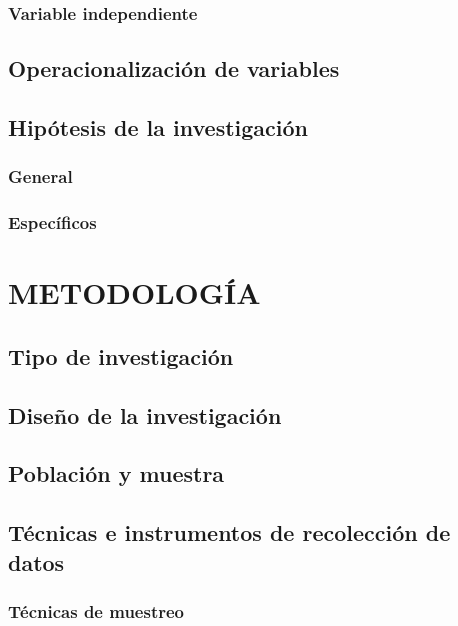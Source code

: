 \documentclass[12pt,a4paper,oneside]{report}
\begin{document}
\subsection{Variable independiente}

\section{Operacionalización de variables}

\section{Hipótesis de la investigación}

\subsection{General}

\subsection{Específicos}

\chapter{METODOLOGÍA}

\section{Tipo de investigación}

\section{Diseño de la investigación}

\section{Población y muestra}

\section{Técnicas e instrumentos de recolección de datos}

\subsection{Técnicas de muestreo}
\end{document}
